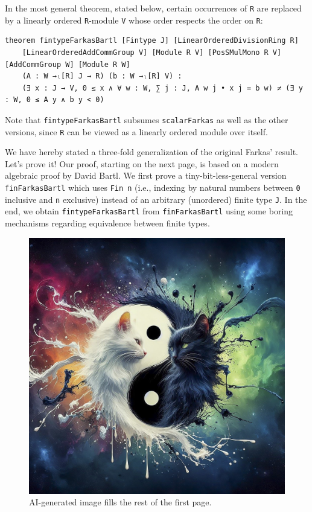 \documentclass[]{article}
\renewcommand{\.}{\hskip .75pt}
\begin{document}
In the most general theorem, stated below, certain occurrences of \texttt{R} are replaced by
a linearly ordered \texttt{R}-module \texttt{V} whose order respects the order on \texttt{R}:
\begin{lstlisting}
theorem fintypeFarkasBartl [Fintype J] [LinearOrderedDivisionRing R]
    [LinearOrderedAddCommGroup V] [Module R V] [PosSMulMono R V] [AddCommGroup W] [Module R W]
    (A : W →ₗ[R] J → R) (b : W →ₗ[R] V) :
    (∃ x : J → V, 0 ≤ x ∧ ∀ w : W, ∑ j : J, A w j • x j = b w) ≠ (∃ y : W, 0 ≤ A y ∧ b y < 0)
\end{lstlisting}

Note that \texttt{fintypeFarkasBartl} subsumes \texttt{scalarFarkas} as well as the other versions,
since \texttt{R} can be viewed as a linearly ordered module over itself.

We have hereby stated a three-fold generalization of the original Farkas' result.
Let's prove it! Our proof, starting on the next page, is based on
a modern algebraic proof by David Bartl. We first prove a tiny-bit-less-general
version \texttt{finFarkasBartl} which uses \texttt{Fin n} (i.e., indexing by natural numbers
between \texttt{0} inclusive and \texttt{n} exclusive) instead of
an arbitrary (unordered) finite type \texttt{J}.
In the end, we obtain \texttt{fintypeFarkasBartl} from \texttt{finFarkasBartl} using
some boring mechanisms regarding equivalence between finite types.

\begin{figure}[ht!]
	\centering
	\includegraphics[width=120mm]{AI-generated.jpg}
	\caption{AI-generated image fills the rest of the first page.}
\end{figure}
\end{document}
